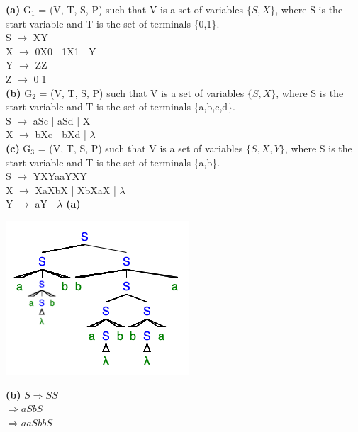 \documentclass{homework}
\begin{document}
\maketitle
\question
\textbf{(a)}
G${_1}$ = (V, T, S, P) such that V is a set of variables $\{S,X\}$, where S is the start variable and T is the set of terminals \{0,1\}.\\
S $\rightarrow$ XY\\
X $\rightarrow$ 0X0 | 1X1 | Y\\
Y $\rightarrow$ ZZ\\
Z $\rightarrow$ 0|1 \\
\newline
\textbf{(b)}
G${_2}$ = (V, T, S, P) such that V is a set of variables $\{S,X\}$, where S is the start variable and T is the set of terminals \{a,b,c,d\}.\\
S $\rightarrow$ aSc | aSd | X\\
X $\rightarrow$ bXc | bXd | $\lambda$\\
\newline
\textbf{(c)}
G${_3}$ = (V, T, S, P) such that V is a set of variables $\{S,X,Y\}$, where S is the start variable and T is the set of terminals \{a,b\}.\\
S $\rightarrow$ YXYaaYXY\\
X $\rightarrow$ XaXbX | XbXaX | $\lambda$\\
Y $\rightarrow$ aY | $\lambda$
\question
\textbf{(a)}
\newline
\begin{center}
\includegraphics{a6q2a.png}
\end{center}
\newline
\textbf{(b)}
$S\Rightarrow SS$\\
\phantom{x}\hspace{4ex} $\Rightarrow aSbS$ \\
\phantom{x}\hspace{4ex} $\Rightarrow aaSbbS$ \\
\end{document}
